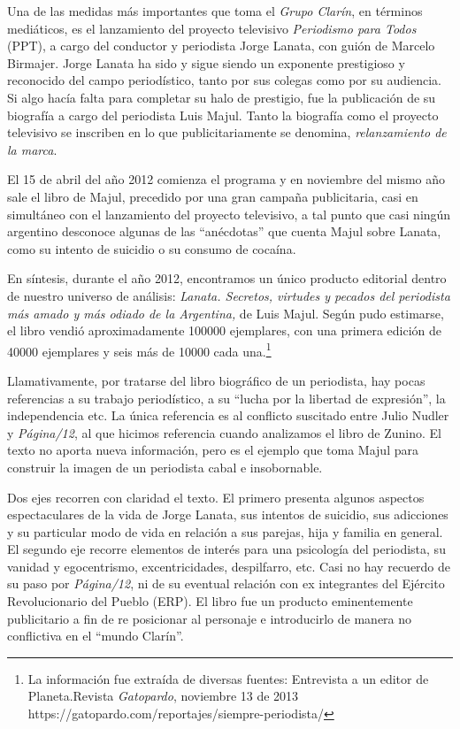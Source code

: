 Una de las medidas más importantes que toma el \emph{Grupo Clarín}, en términos mediáticos, es el lanzamiento del proyecto televisivo \emph{Periodismo para Todos} (PPT), a cargo del conductor y periodista Jorge Lanata, con guión de Marcelo Birmajer. Jorge Lanata ha sido y sigue siendo un exponente prestigioso y reconocido del campo periodístico, tanto por sus colegas como por su audiencia. Si algo hacía falta para completar su halo de prestigio, fue la publicación de su biografía a cargo del periodista Luis Majul. Tanto la biografía como el proyecto televisivo se inscriben en lo que publicitariamente se denomina, \emph{relanzamiento de la marca}.

El 15 de abril del año 2012 comienza el programa y en noviembre del mismo año sale el libro de Majul, precedido por una gran campaña publicitaria, casi en simultáneo con el lanzamiento del proyecto televisivo, a tal punto que casi ningún argentino desconoce algunas de las ``anécdotas'' que cuenta Majul sobre Lanata, como su intento de suicidio o su consumo de cocaína.

{En síntesis, durante el año 2012, encontramos un único producto editorial dentro de nuestro universo de análisis: \emph{Lanata. Secretos, virtudes y pecados del periodista más amado y más odiado de la Argentina,} de Luis Majul. Según pudo estimarse, el libro vendió aproximadamente \num{100 000} ejemplares, con una primera edición de \num{40 000} ejemplares y seis más de \num{10 000} cada una.}\footnote{La información fue extraída de diversas fuentes: Entrevista a un editor de Planeta.Revista \emph{Gatopardo}, noviembre 13 de 2013 https://gatopardo.com/reportajes/siempre-periodista/}

{Llamativamente, por tratarse del libro biográfico de un periodista, hay pocas referencias a su trabajo periodístico, a su ``lucha por la libertad de expresión'', la independencia etc. La única referencia es al conflicto suscitado entre Julio Nudler y \emph{Página/12}, al que hicimos referencia cuando analizamos el libro de Zunino. El texto no aporta nueva información, pero es el ejemplo que toma Majul para construir la imagen de un periodista cabal e insobornable.}

Dos ejes recorren con claridad el texto. El primero presenta algunos aspectos espectaculares de la vida de Jorge Lanata, sus intentos de suicidio, sus adicciones y su particular modo de vida en relación a sus parejas, hija y familia en general. El segundo eje recorre elementos de interés para una psicología del periodista, su vanidad y egocentrismo, excentricidades, despilfarro, etc. Casi no hay recuerdo de su paso por \emph{Página/12}, ni de su eventual relación con ex integrantes del Ejército Revolucionario del Pueblo (ERP). El libro fue un producto eminentemente publicitario a fin de re posicionar al personaje e introducirlo de manera no conflictiva en el ``mundo Clarín''.

